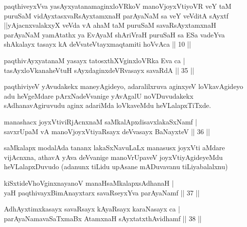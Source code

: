 \begin{shl}
paqthiveyxVva yasAyxyatanamaginxloVRkoV manoVjoyxVtiyoVR veY taM puruSaM vidAyxtasxvaRsAyxtamxnaH parAyaNaM sa veY veVditA sAyxtf ||yAjacnxvalakxyX veVda vA ahaM taM puruSaM savaRsAyxtamxnaH parAyaNaM yamAtathx ya EvAyaM shAriVraH puruSaH sa ESa vadeYva shAkalayx tasayx kA deVvateVtayxmaqtamiti hoVvAca || 10 ||
\end{shl}


\begin{shl}
paqthivAyxyatanaM yasayx tatosxthXV\s ginxloVRka Eva ca |\\
tasAyx\s \s loVkanaheVtuH sAyxdaginxdeVRvasayx savaRdA \hfill || 35 ||
\end{shl}

\begin{artha}
paqthiviyeV yAvudakekx maneyAgideyo, adaralilxruva aginxyeV loVka\-vAgideyo adu heVgeMdare pArxNadeVvanige yAvAgalU noVDuvudakekx sAdhanavAgiruvudu aginx adariMda loVkaveMdu heVLalapxTiTxde.
\end{artha}


\begin{shl}
manashacx joyxVtiviRjAcnxnaM saMkalApxdisavxlakaSxNamf |\\
savxrUpaM vA manoVjoyxVtiyaRsayx deVvasayx BaNayxteV \hfill || 36 ||
\end{shl}

\begin{artha}
saMkalapx modalAda tananx lakaSxNavuLaLx manasusx joyxVti aMdare vijAcnxna, athavA yAva deVvanige manoVrUpaveV joyxVtiyAgideyeMdu heVLalapxDuvudo (adanunx tiLidu upAsane mADuvavanu tiLiyabalalxnu)
\end{artha}


\begin{shl}
kiSxtideVhoV\s ginxnayanoV manaHsaMkalapxsAdhanaH |\\
yaH paqthivayxBimAnayxtarx savaRseyxYva parAyaNamf \hfill || 37 ||
\end{shl}

\begin{shl}
AdhAyxtimxkasayx savaRsayx kAyaRsayx karaNasayx ca |\\
parAyaNamavaSaTxmaBx AtamxnaH sAyxtatxthAvidhamf \hfill || 38 ||
\end{shl}

